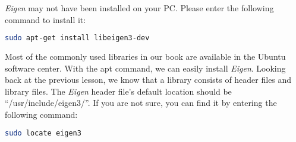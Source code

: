 \textit{Eigen} may not have been installed on your PC. Please enter the following command to install it:

\begin{lstlisting}[language=sh,caption=Terminal input:]
sudo apt-get install libeigen3-dev
\end{lstlisting}

Most of the commonly used libraries in our book are available in the Ubuntu software center. With the apt command, we can easily install \textit{Eigen}. Looking back at the previous lesson, we know that a library consists of header files and library files. The \textit{Eigen} header file's default location should be ``/usr/include/eigen3/''. If you are not sure, you can find it by entering the following command:

\begin{lstlisting}[language=sh,caption=Terminal input:]
sudo locate eigen3
\end{lstlisting}

